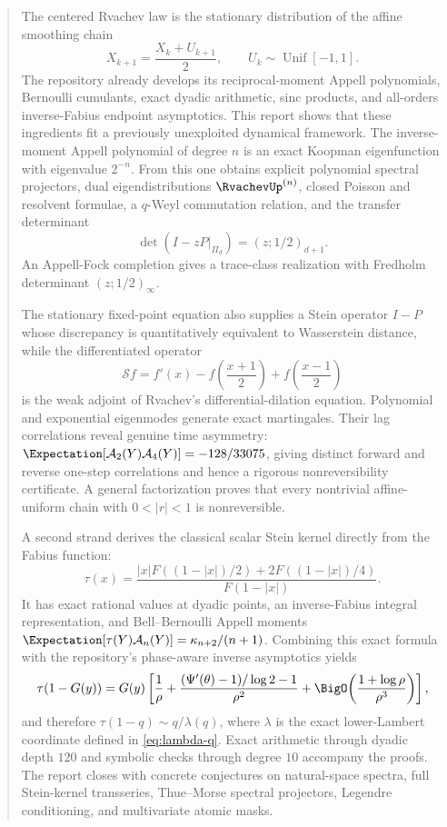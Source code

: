 \documentclass[11pt,a4paper]{article}
\theoremstyle{definition}
\theoremstyle{remark}
\newcommand{\Acal}{\mathcal A}
\newcommand{\Scal}{\mathcal S}
\begin{document}
\begin{abstract}
The centered Rvachev law is the stationary distribution of the affine smoothing chain
\[
 X_{k+1}=\frac{X_k+U_{k+1}}2,
 \qquad U_k\sim\operatorname{Unif}[-1,1].
\]
The repository already develops its reciprocal-moment Appell polynomials, Bernoulli cumulants, exact dyadic arithmetic, sinc products, and all-orders inverse-Fabius endpoint asymptotics. This report shows that these ingredients fit a previously unexploited dynamical framework. The inverse-moment Appell polynomial of degree $n$ is an exact Koopman eigenfunction with eigenvalue $2^{-n}$. From this one obtains explicit polynomial spectral projectors, dual eigendistributions $\RvachevUp^{(n)}$, closed Poisson and resolvent formulae, a $q$-Weyl commutation relation, and the transfer determinant
\[
 \det(I-zP\vert_{\Pi_d})=(z;1/2)_{d+1}.
\]
An Appell-Fock completion gives a trace-class realization with Fredholm determinant $(z;1/2)_\infty$.

The stationary fixed-point equation also supplies a Stein operator $I-P$ whose discrepancy is quantitatively equivalent to Wasserstein distance, while the differentiated operator
\[
 \Scal f=f'(x)-f\!\left(\frac{x+1}{2}\right)+f\!\left(\frac{x-1}{2}\right)
\]
is the weak adjoint of Rvachev's differential-dilation equation. Polynomial and exponential eigenmodes generate exact martingales. Their lag correlations reveal genuine time asymmetry: $\Expectation[\Acal_2(Y)\Acal_4(Y)]=-128/33075$, giving distinct forward and reverse one-step correlations and hence a rigorous nonreversibility certificate. A general factorization proves that every nontrivial affine-uniform chain with $0<|r|<1$ is nonreversible.

A second strand derives the classical scalar Stein kernel directly from the Fabius function:
\[
 \tau(x)=
 \frac{|x|F((1-|x|)/2)+2F((1-|x|)/4)}{F(1-|x|)}.
\]
It has exact rational values at dyadic points, an inverse-Fabius integral representation, and Bell--Bernoulli Appell moments $\Expectation[\tau(Y)\Acal_n(Y)]=\kappa_{n+2}/(n+1)$. Combining this exact formula with the repository's phase-aware inverse asymptotics yields
\[
 \tau(1-G(y))=G(y)\left[
 \frac1\rho+\frac{(\Psi'(\theta)-1)/\log2-1}{\rho^2}
 +\BigO\!\left(\frac{1+\log\rho}{\rho^3}\right)
 \right],
\]
and therefore $\tau(1-q)\sim q/\lambda(q)$, where $\lambda$ is the exact lower-Lambert coordinate defined in \cref{eq:lambda-q}. Exact arithmetic through dyadic depth $120$ and symbolic checks through degree $10$ accompany the proofs. The report closes with concrete conjectures on natural-space spectra, full Stein-kernel transseries, Thue--Morse spectral projectors, Legendre conditioning, and multivariate atomic masks.
\end{abstract}
\end{document}
